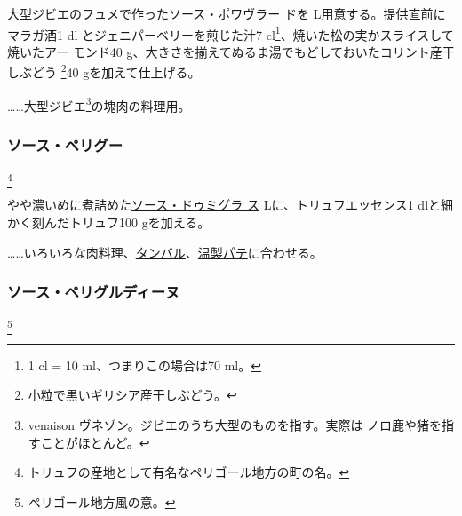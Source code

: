 \begin{recette}

\protect\hyperlink{fonds-de-gibier}{大型ジビエのフュメ}で作った\protect\hyperlink{sauce-poivrade}{ソース・ポワヴラー
ド}を\troisquarts{} L用意する。提供直前にマラガ酒1 dl
とジェニパーベリーを煎じた汁7 cl\footnote{1 cl = 10
  ml、つまりこの場合は70 ml。}、焼いた松の実かスライスして焼いたアー
モンド40 g、大きさを揃えてぬるま湯でもどしておいたコリント産干しぶどう
\footnote{小粒で黒いギリシア産干しぶどう。}40 gを加えて仕上げる。

\ldots{}\ldots{}大型ジビエ\footnote{venaison
  ヴネゾン。ジビエのうち大型のものを指す。実際は
  ノロ鹿や猪を指すことがほとんど。}の塊肉の料理用。

\hypertarget{sauce-perigueux}{%
\subsubsection{ソース・ペリグー}\label{sauce-perigueux}}

\footnote{トリュフの産地として有名なペリゴール地方の町の名。}


やや濃いめに煮詰めた\protect\hyperlink{sauce-demi-glace}{ソース・ドゥミグラ
ス}\troisquarts{} Lに、トリュフエッセンス1 \undemi{}
dlと細かく刻んだトリュフ100 gを加える。

\ldots{}\ldots{}いろいろな肉料理、\protect\hyperlink{}{タンバル}、\protect\hyperlink{}{温製パテ}に合わせる。

\hypertarget{sauce-perigourdine}{%
\subsubsection{ソース・ペリグルディーヌ}\label{sauce-perigourdine}}

\footnote{ペリゴール地方風の意。}


\end{recette}
